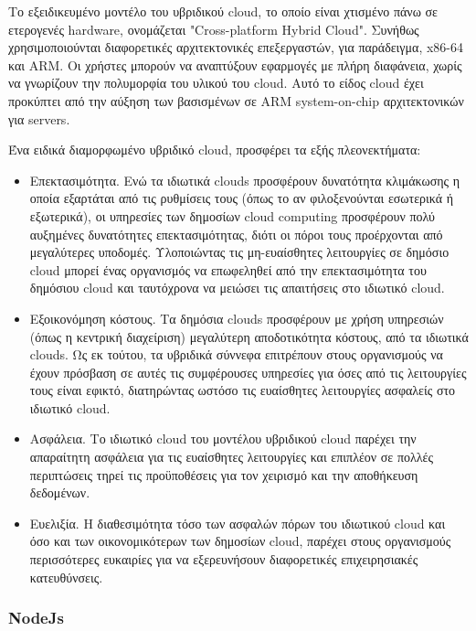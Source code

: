 		Το εξειδικευμένο μοντέλο του υβριδικού cloud, το οποίο είναι χτισμένο πάνω σε ετερογενές hardware, ονομάζεται "Cross-platform Hybrid Cloud". Συνήθως χρησιμοποιούνται διαφορετικές αρχιτεκτονικές επεξεργαστών, για παράδειγμα, x86-64 και ARM. Οι χρήστες μπορούν να αναπτύξουν εφαρμογές με πλήρη διαφάνεια, χωρίς να γνωρίζουν την πολυμορφία του υλικού του cloud. Αυτό το είδος cloud έχει προκύπτει από την αύξηση των βασισμένων σε ARM system-on-chip αρχιτεκτονικών για servers.
		
		Ένα ειδικά διαμορφωμένο υβριδικό cloud, προσφέρει τα εξής πλεονεκτήματα:
		
		\begin{itemize}

		\item Επεκτασιμότητα. Ενώ τα ιδιωτικά clouds προσφέρουν δυνατότητα κλιμάκωσης η οποία εξαρτάται από τις ρυθμίσεις τους (όπως το αν φιλοξενούνται εσωτερικά ή εξωτερικά), οι υπηρεσίες των δημοσίων cloud computing προσφέρουν πολύ αυξημένες δυνατότητες επεκτασιμότητας, διότι οι πόροι τους προέρχονται από μεγαλύτερες υποδομές. Υλοποιώντας τις μη-ευαίσθητες λειτουργίες σε δημόσιο cloud μπορεί ένας οργανισμός να επωφεληθεί από την επεκτασιμότητα του δημόσιου cloud και ταυτόχρονα να μειώσει τις απαιτήσεις στο ιδιωτικό cloud.
		
		\item Εξοικονόμηση κόστους. Τα δημόσια clouds  προσφέρουν με χρήση υπηρεσιών (όπως η κεντρική διαχείριση) μεγαλύτερη αποδοτικότητα κόστους, από  τα ιδιωτικά clouds. Ως εκ τούτου, τα υβριδικά σύννεφα επιτρέπουν στους οργανισμούς να έχουν πρόσβαση σε αυτές τις συμφέρουσες υπηρεσίες για όσες από τις λειτουργίες τους είναι εφικτό, διατηρώντας ωστόσο τις ευαίσθητες λειτουργίες ασφαλείς στο ιδιωτικό cloud.

		\item Ασφάλεια. Το ιδιωτικό cloud του μοντέλου υβριδικού cloud παρέχει την απαραίτητη ασφάλεια για τις ευαίσθητες λειτουργίες και επιπλέον σε πολλές περιπτώσεις τηρεί τις προϋποθέσεις για τον χειρισμό και την αποθήκευση δεδομένων.

		\item Ευελιξία. Η διαθεσιμότητα τόσο των ασφαλών πόρων του ιδιωτικού cloud και όσο και των οικονομικότερων των δημοσίων cloud, παρέχει στους οργανισμούς περισσότερες ευκαιρίες για να εξερευνήσουν διαφορετικές επιχειρησιακές κατευθύνσεις.
		\end{itemize} 
		
		\subsubsection{NodeJs}
	
